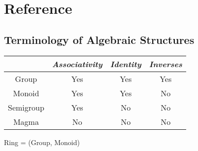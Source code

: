 \documentclass[11pt,a4paper]{article}
\begin{document}
\section{Reference}

\subsection{Terminology of Algebraic Structures}

\begin{tabular}{cccc}
    \toprule
               & \emph{Associativity} & \emph{Identity} & \emph{Inverses} \\
    \midrule
    Group      & Yes                  & Yes             & Yes \\
    Monoid     & Yes                  & Yes             & No  \\
    Semigroup  & Yes                  & No              & No  \\
    Magma      & No                   & No              & No  \\
    \bottomrule
\end{tabular}

Ring = (Group, Monoid)
\end{document}
